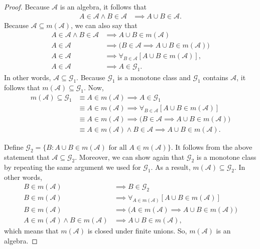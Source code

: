 \documentclass[10pt]{article}
\newcommand{\mcal}[1]{\mathcal{#1}}
\begin{document}
\begin{itemize}
\begin{proof}
    Because $\mcal{A}$ is an algebra, it follows that
    \begin{align*}
      A \in \mcal{A} \wedge B \in \mcal{A} &\implies A \cup B \in \mcal{A}.
    \end{align*}
    Because $\mcal{A} \subseteq m(\mcal{A})$, we can also say that
    \begin{align*}
      A \in \mcal{A} \wedge B \in \mcal{A} &\implies A \cup B \in m(\mcal{A}) \\
      A \in \mcal{A} &\implies \Big( B \in \mcal{A} \implies A \cup B \in m(\mcal{A}) \Big) \\
      A \in \mcal{A} &\implies \forall_{B \in \mcal{A}} [ A \cup B \in m(\mcal{A}) ], \\
      A \in \mcal{A} &\implies A \in \mcal{G}_1.
    \end{align*}
    In other words, $\mcal{A} \subseteq \mcal{G}_1$. Because $\mcal{G}_1$ is a monotone class and $\mcal{G}_1$ contains $\mcal{A}$, it follows that $m(\mcal{A}) \subseteq \mcal{G}_1$.
    Now,
    \begin{align*}
      m(\mcal{A}) \subseteq \mcal{G}_1 
      &\equiv A \in m(\mcal{A}) \implies A \in \mcal{G}_1 \\
      &\equiv A \in m(\mcal{A}) \implies \forall_{B \in \mcal{A}} [ A \cup B \in m(\mcal{A})] \\
      &\equiv A \in m(\mcal{A}) \implies \Big( B \in \mcal{A} \implies A \cup B \in m(\mcal{A}) \Big) \\
      &\equiv A \in m(\mcal{A}) \wedge B \in \mcal{A} \implies A \cup B \in m(\mcal{A}).
    \end{align*}
    
    Define $\mcal{G}_2 = \{ B: A \cup B \in m(\mcal{A})\mbox{ for all }A \in m(\mcal{A})\}$. It follows from the above statement that $\mcal{A} \subseteq \mcal{G}_2$. Moreover, we can show again that $\mcal{G}_2$ is a monotone class by repeating the same argument we used for $\mcal{G}_1$. As a result, $m(\mcal{A}) \subseteq \mcal{G}_2$. In other words,
    \begin{align*}
      B \in m(\mcal{A}) &\implies B \in \mcal{G}_2 \\
      B \in m(\mcal{A}) &\implies \forall_{A \in m(\mcal{A})} [A \cup B \in m(\mcal{A})] \\
      B \in m(\mcal{A}) &\implies \Big( A \in m(\mcal{A}) \implies A \cup B \in m(\mcal{A}) \Big) \\
      A \in m(\mcal{A}) \wedge B \in m(\mcal{A}) &\implies A \cup B \in m(\mcal{A}),
    \end{align*}
    which means that $m(\mcal{A})$ is closed under finite unions. So, $m(\mcal{A})$ is an algebra.
  \end{proof}
\end{itemize}
\end{document}
